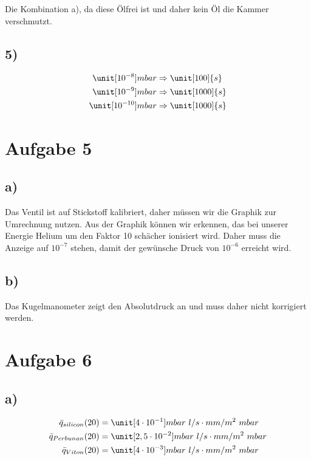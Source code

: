Die Kombination a), da diese Ölfrei ist und daher kein Öl die Kammer verschmutzt.

\subsection*{5)}

\begin{align*}
\unit[10^{-8}]{mbar} &\Rightarrow \unit[100]{s} \\
\unit[10^{-9}]{mbar} &\Rightarrow \unit[1000]{s} \\
\unit[10^{-10}]{mbar} &\Rightarrow \unit[1000]{s} \\
\end{align*}


\section{Aufgabe 5}

\subsection*{a)}

Das Ventil ist auf Stickstoff kalibriert, daher müssen wir die Graphik zur Umrechnung nutzen. Aus der Graphik können wir erkennen, das bei unserer Energie Helium um den Faktor 10 schächer ionisiert wird. Daher muss die Anzeige auf $10^{-7}$ stehen, damit der gewünsche Druck von $10^{-6}$ erreicht wird.

\subsection*{b)}

Das Kugelmanometer zeigt den Absolutdruck an und muss daher nicht korrigiert werden.


\section*{Aufgabe 6}

\subsection*{a)}

\begin{align*}
\bar{q}_{silicon}(20) &= \unit[4 \cdot 10^{-1}]{mbar\ l / s \cdot mm/ m^2 \ mbar} \\
\bar{q}_{Perbunan}(20) &= \unit[2,5 \cdot 10^{-2}]{mbar\ l / s \cdot mm/ m^2 \ mbar} \\
\bar{q}_{Viton}(20) &= \unit[4 \cdot 10^{-3}]{mbar\ l / s \cdot mm/ m^2 \ mbar} \\
\end{align*}

